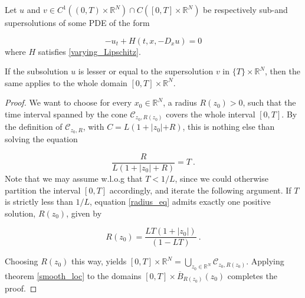 \begin{corollary}
			\label{Smooth Uniqueness}
			Let $ u $ and $ v \in C^{1}(\left(0, T \right) \times \mathbb{R}^N) \cap C(\left[ 0, T \right] \times \mathbb{R}^{N}) $ be respectively sub-and supersolutions of some PDE of the form
			
			\begin{equation*}
				-u_t + H(t, x, -D_x u) = 0
			\end{equation*}
			where $ H $ satisfies \ref{varying_Lipschitz}.
			
			If the subsolution $ u $ is lesser or equal to the supersolution $ v $ in $ \{ T \} \times \mathbb{R}^{N} $, then the same applies to the whole domain $ \left[ 0, T \right] \times \mathbb{R}^{N} $.
			
			\begin{proof}
				We want to choose for every $ x_0 \in \mathbb{R}^{N} $, a radius $ R(z_0) > 0 $, such that the time interval spanned by the cone $ \mathcal{C}_{z_0, R(z_0)} $ covers the whole interval $ \left[0, T \right] $. By the definition of $ \mathcal{C}_{z_0, R} $, with $ C = L (1 + \lvert z_0 \lvert + R) $, this is nothing else than solving the equation
				
				\begin{equation}
				\label{radius_eq}
					\frac{R}{L(1 + |z_0| + R)} = T \ .
				\end{equation}
				Note that we may assume w.l.o.g that $ T < 1 / L $, since we could otherwise partition the interval $ \left[ 0, T \right] $ accordingly, and iterate the following argument.
				If $ T $ is strictly less than $ 1 / L $, equation \ref{radius_eq} admits exactly one positive solution, $ R(z_0) $, given by
				
				\begin{equation*}
					R(z_0) = \frac{LT(1 + \lvert z_0 \rvert)}{(1 - LT)} \ .
				\end{equation*}
				
				Choosing $ R(z_0) $ this way, yields $ \left[0, T\right] \times \mathbb{R}^{N} = \bigcup\limits_{z_0 \in \mathbb{R}^{N}} \mathcal{C}_{z_0, R(z_0)} $. Applying theorem \ref{smooth_loc} to the domains $ \left[ 0, T \right] \times \overline{B}_{R(z_0)}(z_0)$ completes the proof.
			\end{proof}
		\end{corollary}